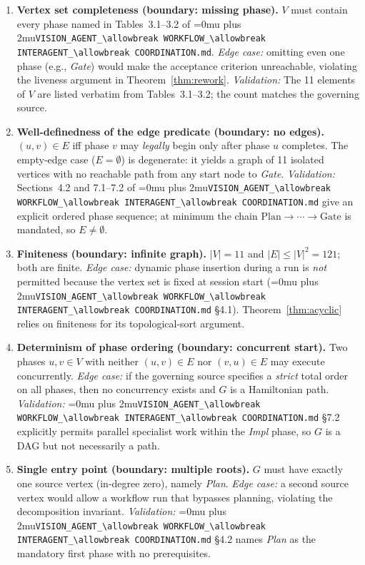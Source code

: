 \documentclass[12pt]{article}
\theoremstyle{definition}
\DeclareRobustCommand{\code}[1]{\begingroup\Urlmuskip=0mu plus 2mu\relax\nolinkurl{#1}\endgroup}
\newcommand{\VisionFlow}{\code{VISION\_AGENT\_\allowbreak WORKFLOW\_\allowbreak INTERAGENT\_\allowbreak COORDINATION.md}}
\begin{document}
\begin{enumerate}[label=\textbf{W\arabic*.}, leftmargin=*, widest=W9]

  \item \textbf{Vertex set completeness (boundary: missing phase).}
        $V$ must contain every phase named in Tables~3.1--3.2 of
        \VisionFlow{}.
        \emph{Edge case:} omitting even one phase (e.g., \textit{Gate})
        would make the acceptance criterion unreachable, violating the
        liveness argument in Theorem~\ref{thm:rework}.
        \emph{Validation:} The 11 elements of $V$ are listed verbatim
        from Tables~3.1--3.2; the count matches the governing source.

  \item \textbf{Well-definedness of the edge predicate (boundary: no
        edges).}
        $(u,v)\in E$ iff phase $v$ may \emph{legally} begin only after
        phase $u$ completes.  The empty-edge case ($E = \emptyset$) is
        degenerate: it yields a graph of 11 isolated vertices with no
        reachable path from any start node to \textit{Gate}.
        \emph{Validation:} Sections~4.2 and 7.1--7.2 of \VisionFlow{}
        give an explicit ordered phase sequence; at minimum the chain
        $\mathrm{Plan} \to \cdots \to \mathrm{Gate}$ is
        mandated, so $E \neq \emptyset$.

  \item \textbf{Finiteness (boundary: infinite graph).}
        $|V| = 11$ and $|E| \leq |V|^2 = 121$; both are finite.
        \emph{Edge case:} dynamic phase insertion during a run is
        \emph{not} permitted because the vertex set is fixed at session
        start (\VisionFlow{} \S4.1).  Theorem~\ref{thm:acyclic}
        relies on finiteness for its topological-sort argument.

  \item \textbf{Determinism of phase ordering (boundary: concurrent
        start).}
        Two phases $u, v \in V$ with neither $(u,v) \in E$ nor
        $(v,u) \in E$ may execute concurrently.
        \emph{Edge case:} if the governing source specifies a
        \emph{strict} total order on all phases, then no concurrency
        exists and $G$ is a Hamiltonian path.
        \emph{Validation:} \VisionFlow{} \S7.2 explicitly permits
        parallel specialist work within the \textit{Impl} phase, so
        $G$ is a DAG but not necessarily a path.

  \item \textbf{Single entry point (boundary: multiple roots).}
        $G$ must have exactly one source vertex (in-degree zero),
        namely \textit{Plan}.
        \emph{Edge case:} a second source vertex would allow a workflow
        run that bypasses planning, violating the decomposition
        invariant.
        \emph{Validation:} \VisionFlow{} \S4.2 names \textit{Plan} as
        the mandatory first phase with no prerequisites.


\end{enumerate}
\end{document}

